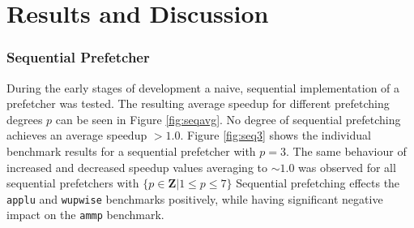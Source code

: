 \section{Results and Discussion}
\label{sec:results-and-discussion}
%

\subsubsection{Sequential Prefetcher}
During the early stages of development a naive, sequential implementation of a prefetcher was tested.
The resulting average speedup for different prefetching degrees $p$ can be seen in Figure \ref{fig:seqavg}.
No degree of sequential prefetching achieves an average speedup $> 1.0$.
Figure \ref{fig:seq3} shows the individual benchmark results for a sequential prefetcher with $p = 3$.
The same behaviour of increased and decreased speedup values averaging to $\sim 1.0$ was observed for all sequential prefetchers with $\{p \in \mathbf{Z} | 1 \leq p \leq 7\}$
Sequential prefetching effects the \texttt{applu} and \texttt{wupwise} benchmarks positively, while having significant negative impact on the \texttt{ammp} benchmark.

\begin{figure*}
  
  \caption{Average speedup as a function of degree for the sequential prefetcher.}
  \label{fig:seqavg}
\end{figure*}

\begin{figure*}
  
  \caption{Performance of sequential prefetcher with $p = 3$ across benchmarks.}
  \label{fig:seq3}
\end{figure*}

